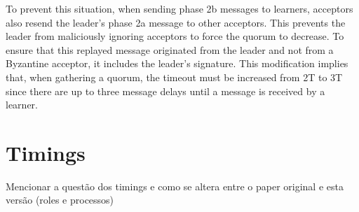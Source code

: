 To prevent this situation, when sending phase 2b messages to learners, acceptors also resend the leader's phase 2a message to other acceptors. This prevents the leader from maliciously ignoring acceptors to force the quorum to decrease. To ensure that this replayed message originated from the leader and not from a Byzantine acceptor, it includes the leader's signature. This modification implies that, when gathering a quorum, the timeout must be increased from 2T to 3T since there are up to three message delays until a message is received by a learner.

\section{Timings }
Mencionar a questão dos timings e como se altera entre o paper original e esta versão (roles e processos)